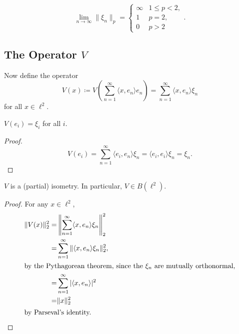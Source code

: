\documentclass[12pt]{article}
\begin{document}
\begin{corollary}[]
	\begin{equation*}
		\lim_{n\to\infty}\|\xi_n\|_p =
		\begin{cases}
			\infty & 1\leq p < 2, \\
			1 & p = 2, \\
			0 & p > 2
		\end{cases}.
	\end{equation*}
\end{corollary}


\subsection{The Operator $V$} %

Now define the operator 
\begin{equation*}
	V(x) \coloneqq V\left(\sum_{n=1}^\infty \langle x, e_n\rangle e_n\right) = \sum_{n=1}^\infty \langle x, e_n\rangle \xi_n
\end{equation*}
for all $x\in \ell^2$. 

\begin{proposition}[]
	$V(e_i)=\xi_i$ for all $i$.
\end{proposition}

\begin{proof}
	\begin{equation*}
		V(e_i)=\sum_{n=1}^\infty\langle e_i,e_n\rangle \xi_n=\langle e_i,e_i\rangle \xi_n=\xi_n.
	\end{equation*}
\end{proof}

\begin{proposition}[]
	$V$ is a (partial) isometry. In particular, $V\in B(\ell^2)$.
\end{proposition}

\begin{proof}
	For any $x\in\ell^2$,
	\begin{align*}
		\|V(x)\|_2^2 
		=& \left\|\sum_{n=1}^\infty \langle x,e_n\rangle \xi_n\right\|_2^2 \\
		=& \sum_{n=1}^\infty \|\langle x,e_n\rangle \xi_n\|_2^2, \\
		\intertext{by the Pythagorean theorem, since the $\xi_n$ are mutually orthonormal,}
		=& \sum_{n=1}^\infty |\langle x,e_n\rangle |^2 \\
		=& \|x\|_2^2 \\
		\intertext{by Parseval's identity.}
	\end{align*}
\end{proof}
\end{document}
